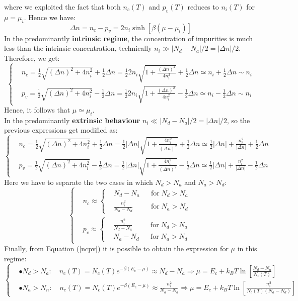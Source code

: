 \documentclass[10.75pt,a4paper,openright,bottom=2cm]{article}
\renewcommand{\refeq}[1]{\hyperref[#1]{Equation (\ref{#1})}}
\begin{document}
where we exploited the fact that both $n_c(T)$ and $p_v(T)$ reduces to $n_i(T)$ for $\mu=\mu_i$. Hence we have:
\[
\Delta n=n_c-p_v=2n_i\sinh{[\beta(\mu-\mu_i)]}
\]
In the predominantly \textbf{intrinsic regime}, the concentration of impurities is much less than the intrinsic concentration, technically $n_i\gg|N_d-N_a|/2=|\Delta n|/2$. Therefore, we get:
\[
\left\{
\begin{aligned}
&n_c=\frac{1}{2}\sqrt{(\Delta n)^2+4n_i^2}+\frac{1}{2}\Delta n=\frac{1}{2}2n_i\sqrt{1+\frac{(\Delta n)^2}{4n_i^2}}+\frac{1}{2}\Delta n\simeq n_i+\frac{1}{2}\Delta n\sim n_i\\
&p_v=\frac{1}{2}\sqrt{(\Delta n)^2+4n_i^2}-\frac{1}{2}\Delta n=\frac{1}{2}2n_i\sqrt{1+\frac{(\Delta n)^2}{4n_i^2}}-\frac{1}{2}\Delta n\simeq n_i-\frac{1}{2}\Delta n\sim n_i
\end{aligned}
\right.
\]
Hence, it follows that $\mu\simeq\mu_i$.\\
In the predominantly \textbf{extrinsic behaviour} $n_i\ll|N_d-N_a|/2=|\Delta n|/2$, so the previous expressions get modified as:
\[
\left\{
\begin{aligned}
&n_c=\frac{1}{2}\sqrt{(\Delta n)^2+4n_i^2}+\frac{1}{2}\Delta n=\frac{1}{2}|\Delta n|\sqrt{1+\frac{4n_i^2}{(\Delta n)^2}}+\frac{1}{2}\Delta n\simeq \frac{1}{2}|\Delta n|+\frac{n_i^2}{|\Delta n|}+\frac{1}{2}\Delta n\\
&p_v=\frac{1}{2}\sqrt{(\Delta n)^2+4n_i^2}-\frac{1}{2}\Delta n=\frac{1}{2}|\Delta n|\sqrt{1+\frac{4n_i^2}{(\Delta n)^2}}-\frac{1}{2}\Delta n\simeq \frac{1}{2}|\Delta n|+\frac{n_i^2}{|\Delta n|}-\frac{1}{2}\Delta n
\end{aligned}
\right.
\]
Here we have to separate the two cases in which $N_d>N_a$ and $N_a>N_d$:
\[
\left\{
\begin{aligned}
&n_c\approx\left\{
\begin{aligned}&N_d-N_a&&\text{for}\;N_d>N_a\\
&\frac{n_i^2}{N_a-N_d}&&\text{for}\;N_a>N_d
\end{aligned}
\right.\\
&p_v\approx\left\{
\begin{aligned}&\frac{n_i^2}{N_d-N_a}&&\text{for}\;N_d>N_a\\
&N_a-N_d&&\text{for}\;N_a>N_d
\end{aligned}
\right.
\end{aligned}
\right.
\]
Finally, from \refeq{ncpv} it is possible to obtain the expression for $\mu$ in this regime:
\[
\left\{
\begin{aligned}
&\bullet N_d>N_a: \quad n_c(T)=N_c(T)e^{-\beta(E_c-\mu)}\approx N_d-N_a\Rightarrow\mu=E_c+k_BT\ln\left[\frac{N_d-N_a}{N_c(T)}\right]\\
&\bullet N_a>N_n: \quad n_c(T)=N_c(T)e^{-\beta(E_c-\mu)}\approx \frac{n_i^2}{N_a-N_d}\Rightarrow\mu=E_c+k_BT\ln\left[\frac{n_i^2}{N_c(T)(N_a-N_d)}\right]
\end{aligned}
\right.
\]
\end{document}
